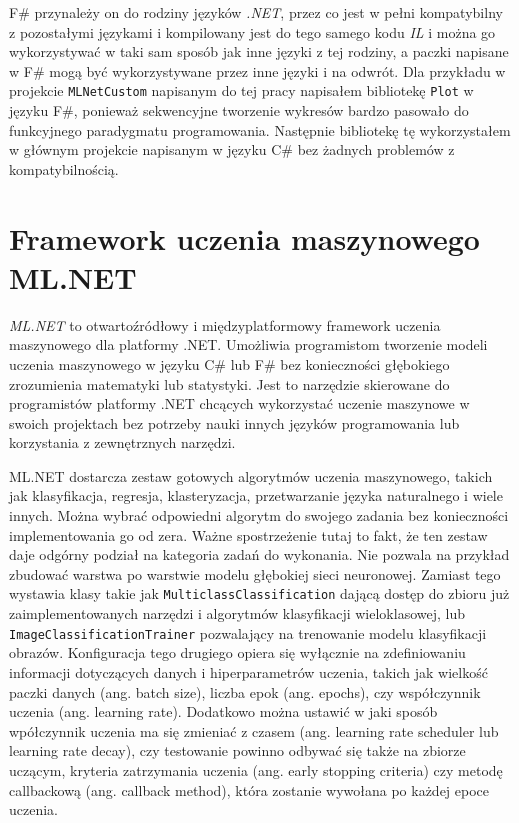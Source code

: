 F\# przynależy on do rodziny języków \emph{.NET}, przez co jest w pełni kompatybilny z pozostałymi językami i kompilowany jest do tego samego kodu \emph{IL} i można go wykorzystywać w taki sam sposób jak inne języki z tej rodziny, a paczki napisane w F\# mogą być wykorzystywane przez inne języki i na odwrót.
Dla przykładu w projekcie \lstinline{MLNetCustom} napisanym do tej pracy napisałem bibliotekę \lstinline{Plot} w języku F\#, ponieważ sekwencyjne tworzenie wykresów bardzo pasowało do funkcyjnego paradygmatu programowania.
Następnie bibliotekę tę wykorzystałem w głównym projekcie napisanym w języku C\# bez żadnych problemów z kompatybilnością.

\section{Framework uczenia maszynowego ML.NET}

\emph{ML.NET} to otwartoźródłowy i międzyplatformowy framework uczenia maszynowego dla platformy .NET.
Umożliwia programistom tworzenie modeli uczenia maszynowego w języku C\# lub F\# bez konieczności głębokiego zrozumienia matematyki lub statystyki.
Jest to narzędzie skierowane do programistów platformy .NET chcących wykorzystać uczenie maszynowe w swoich projektach bez potrzeby nauki innych języków programowania lub korzystania z zewnętrznych narzędzi.

ML.NET dostarcza zestaw gotowych algorytmów uczenia maszynowego, takich jak klasyfikacja, regresja, klasteryzacja, przetwarzanie języka naturalnego i wiele innych.
Można wybrać odpowiedni algorytm do swojego zadania bez konieczności implementowania go od zera.
Ważne spostrzeżenie tutaj to fakt, że ten zestaw daje odgórny podział na kategoria zadań do wykonania.
Nie pozwala na przykład zbudować warstwa po warstwie modelu głębokiej sieci neuronowej.
Zamiast tego wystawia klasy takie jak \lstinline{MulticlassClassification} dającą dostęp do zbioru już zaimplementowanych narzędzi i algorytmów klasyfikacji wieloklasowej, lub \lstinline{ImageClassificationTrainer} pozwalający na trenowanie modelu klasyfikacji obrazów.
Konfiguracja tego drugiego opiera się wyłącznie na zdefiniowaniu informacji dotyczących danych i hiperparametrów uczenia, takich jak wielkość paczki danych (ang. batch size), liczba epok (ang. epochs), czy współczynnik uczenia (ang. learning rate).
Dodatkowo można ustawić w jaki sposób wpółczynnik uczenia ma się zmieniać z czasem (ang. learning rate scheduler lub learning rate decay), czy testowanie powinno odbywać się także na zbiorze uczącym, kryteria zatrzymania uczenia (ang. early stopping criteria) czy metodę callbackową (ang. callback method), która zostanie wywołana po każdej epoce uczenia.

